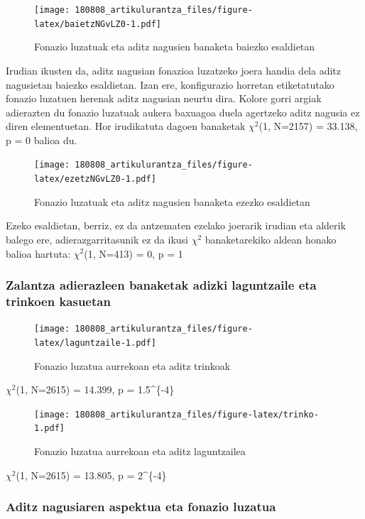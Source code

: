 \documentclass[]{article}
\begin{document}
\begin{figure}
\centering
\texttt{[image: 180808\_artikulurantza\_files/figure-latex/baietzNGvLZ0-1.pdf]}
\caption{Fonazio luzatuak eta aditz nagusien banaketa baiezko
esaldietan}
\end{figure}

Irudian ikusten da, aditz nagusian fonazioa luzatzeko joera handia dela
aditz nagusietan baiezko esaldietan. Izan ere, konfigurazio horretan
etiketatutako fonazio luzatuen herenak aditz nagusian neurtu dira.
Kolore gorri argiak adierazten du fonazio luzatuak aukera baxuagoa duela
agertzeko aditz nagusia ez diren elementuetan. Hor irudikatuta dagoen
banaketak \(\chi^2\)(1, N=2157) = 33.138, p = 0 balioa du.

\begin{figure}
\centering
\texttt{[image: 180808\_artikulurantza\_files/figure-latex/ezetzNGvLZ0-1.pdf]}
\caption{Fonazio luzatuak eta aditz nagusien banaketa ezezko esaldietan}
\end{figure}

Ezeko esaldietan, berriz, ez da antzematen ezelako joerarik irudian eta
alderik balego ere, adierazgarritasunik ez da ikusi \(\chi^2\)
banaketarekiko aldean honako balioa hartuta: \(\chi^2\)(1, N=413) = 0, p
= 1

\subsubsection{Zalantza adierazleen banaketak adizki laguntzaile eta
trinkoen
kasuetan}\label{zalantza-adierazleen-banaketak-adizki-laguntzaile-eta-trinkoen-kasuetan}

\begin{figure}
\centering
\texttt{[image: 180808\_artikulurantza\_files/figure-latex/laguntzaile-1.pdf]}
\caption{Fonazio luzatua aurrekoan eta aditz trinkoak}
\end{figure}

\(\chi^2\)(1, N=2615) = 14.399, p = 1.5\^{}\{-4\}

\begin{figure}
\centering
\texttt{[image: 180808\_artikulurantza\_files/figure-latex/trinko-1.pdf]}
\caption{Fonazio luzatua aurrekoan eta aditz laguntzailea}
\end{figure}

\(\chi^2\)(1, N=2615) = 13.805, p = 2\^{}\{-4\}

\subsubsection{Aditz nagusiaren aspektua eta fonazio
luzatua}\label{aditz-nagusiaren-aspektua-eta-fonazio-luzatua}
\end{document}
